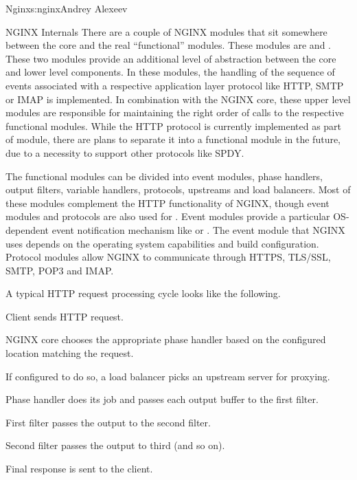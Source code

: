 \begin{aosachapter}{Nginx}{s:nginx}{Andrey Alexeev}
\begin{aosasect1}{NGINX Internals}
There are a couple of NGINX modules that sit somewhere between the
core and the real ``functional'' modules. These modules are
 and . These two modules provide an additional
level of abstraction between the core and lower level components. In
these modules, the handling of the sequence of events associated with
a respective application layer protocol like HTTP, SMTP or IMAP is
implemented. In combination with the NGINX core, these upper level
modules are responsible for maintaining the right order of calls to
the respective functional modules. While the HTTP protocol is
currently implemented as part of  module, there are plans
to separate it into a functional module in the future, due to a
necessity to support other protocols like SPDY.

The functional modules can be divided into event modules, phase
handlers, output filters, variable handlers, protocols, upstreams and
load balancers. Most of these modules complement the HTTP
functionality of NGINX, though event modules and protocols are also
used for . Event modules provide a particular OS-dependent
event notification mechanism like  or .  The
event module that NGINX uses depends on the operating system
capabilities and build configuration. Protocol modules allow NGINX to
communicate through HTTPS, TLS/SSL, SMTP, POP3 and IMAP.

A typical HTTP request processing cycle looks like the following.

\begin{aosaenumerate}

\item Client sends HTTP request.

\item NGINX core chooses the appropriate phase handler based on the
  configured location matching the request.

\item If configured to do so, a load balancer picks an upstream server
  for proxying.

\item Phase handler does its job and passes each output buffer to the first
  filter.

\item First filter passes the output to the second filter.

\item Second filter passes the output to third (and so on).

\item Final response is sent to the client.


\end{aosaenumerate}
\end{aosasect1}
\end{aosachapter}

